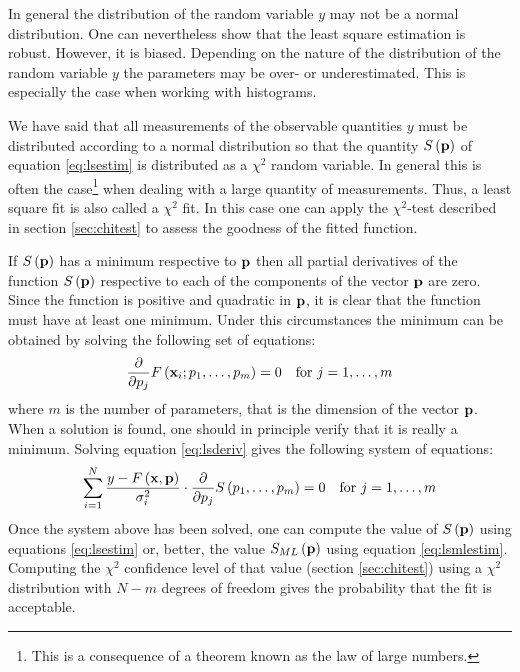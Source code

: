 In general the distribution of the random variable $y$ may not be
a normal distribution. One can nevertheless show that the least
square estimation is robust. However, it is biased. Depending on
the nature of the distribution of the random variable $y$ the
parameters may be over- or underestimated. This is especially the
case when working with histograms.

We have said that all measurements of the observable quantities
$y$ must be distributed according to a normal distribution so that
the quantity $S\left({\textbf p}\right)$ of equation \ref{eq:lsestim}
is distributed as a $\chi^2$ random variable. In general this is
often the case\footnote{This is a consequence of a theorem known
as the law of large numbers.} when dealing with a large quantity
of measurements. Thus, a least square fit is also called a
$\chi^2$ fit. In this case one can apply the $\chi^2$-test
described in section \ref{sec:chitest} to assess the goodness of
the fitted function.

If $S\left({\textbf p}\right)$ has a minimum respective to ${\textbf p}$
then all partial derivatives of the function $S\left({\textbf
p}\right)$ respective to each of the components of the vector
${\textbf p}$ are zero. Since the function is positive and quadratic
in ${\textbf p}$, it is clear that the function must have at least one
minimum. Under this circumstances the minimum can be obtained by
solving the following set of equations:
\begin{equation}
\label{eq:lsderiv}
  {\displaystyle \partial\over\displaystyle\partial p_j}
  F\left({\textbf x}_i;p_1,\ldots,p_m\right)=0\mbox{\quad for $j=1,\ldots,m$}
\end{equation}
where $m$ is the number of parameters, that is the dimension of
the vector ${\textbf p}$. When a solution is found, one should in
principle verify that it is really a minimum. Solving equation
\ref{eq:lsderiv} gives the following system of equations:
\begin{equation}
\label{eq:lsequs}
  \sum_{i=1}^N {
  y-F\left({\textbf x},{\textbf p}\right)\over \sigma_i^2}\cdot
  {\displaystyle \partial\over\displaystyle\partial p_j} S\left(p_1,\ldots,p_m\right)
  =0\mbox{\quad for $j=1,\ldots,m$}
\end{equation}
Once the system above has been solved, one can compute the value
of $S\left({\textbf p}\right)$ using equations \ref{eq:lsestim} or,
better, the value $S_{\mathop{ML}}\left({\textbf p}\right)$ using
equation \ref{eq:lsmlestim}. Computing the $\chi^2$ confidence
level of that value (\cf section \ref{sec:chitest}) using a
$\chi^2$ distribution with $N-m$ degrees of freedom gives the
probability that the fit is acceptable.

